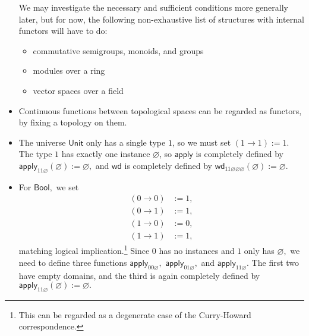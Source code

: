 \documentclass[a4paper]{article}
\theoremstyle{definition}
\theoremstyle{remark}
\renewcommand{\emptyset}{\varnothing}
\newcommand{\nm}{\mathsf}
\newcommand{\universe}{\nm}
\newcommand{\Unit}{\universe{Unit}}
\newcommand{\Bool}{\universe{Bool}}
\newcommand{\apply}{\nm{apply}}
\newcommand{\congrArg}{\nm{wd}}
\begin{document}
\begin{itemize}
  We may investigate the necessary and sufficient conditions more generally later, but for
  now, the following non-exhaustive list of structures with internal functors will have to
  do:
  \begin{itemize}
    \item commutative semigroups, monoids, and groups
    \item modules over a ring
    \item vector spaces over a field
  \end{itemize}
  \item Continuous functions between topological spaces can be regarded as functors, by
  fixing a topology on them.
  \item The universe $\Unit$ only has a single type $1$, so we must set $(1 \to 1) := 1.$
  The type $1$ has exactly one instance $\emptyset$, so $\apply$ is completely
  defined by $\apply_{11\emptyset}(\emptyset) := \emptyset,$ and $\congrArg$ is completely
  defined by $\congrArg_{11\emptyset\emptyset\emptyset}(\emptyset) := \emptyset.$
  \item For $\Bool,$ we set
  \begin{align*}
    (0 \to 0) &:= 1,\\
    (0 \to 1) &:= 1,\\
    (1 \to 0) &:= 0,\\
    (1 \to 1) &:= 1,
  \end{align*}
  matching logical implication.\footnote{This can be regarded as a degenerate case of
  the Curry-Howard correspondence.} Since $0$ has no instances and $1$ only has
  $\emptyset,$ we need to define three functions $\apply_{00\emptyset},$
  $\apply_{01\emptyset},$ and $\apply_{11\emptyset}.$ The first two have empty domains,
  and the third is again completely defined by
  $\apply_{11\emptyset}(\emptyset) := \emptyset.$
\end{itemize}
\end{document}
